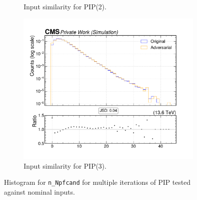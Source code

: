 \begin{figure}[htbp]
\begin{subfigure}[t]{0.32\textwidth}
    \caption{Input similarity for PIP(2).}
  \end{subfigure}\hfill
  \begin{subfigure}[t]{0.32\textwidth}
    \includegraphics[width=\linewidth]{media/output/features/compare/intprob_3/cmp_global_features_n_Npfcand.pdf}
    \caption{Input similarity for PIP(3).}
  \end{subfigure}

  \caption{Histogram for \texttt{n\_Npfcand} for multiple iterations of PIP tested against nominal inputs.}
  \label{fig:intprob_input_n_Npfcand}
\end{figure}
